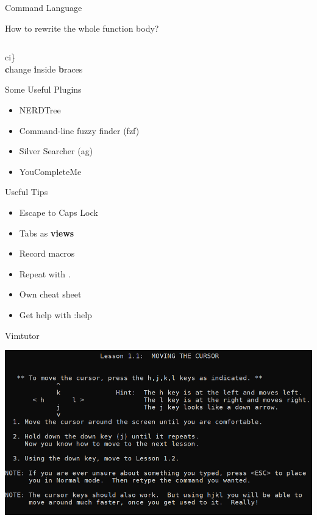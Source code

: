\documentclass{beamer}
\begin{document}
\begin{frame}{Command Language}
    \begin{block}{How to rewrite the whole function body?}
    \end{block}
    \inputminted{js}{codes/changeInsideBlock.js}
    \pause
    \begin{center}
        \huge
        ci\}
        \\
        \textbf{c}hange \textbf{i}nside \textbf{b}races
    \end{center}
\end{frame}

\begin{frame}{Some Useful Plugins}
    \begin{itemize}
        \item NERDTree
        \item Command-line fuzzy finder (fzf)
        \item Silver Searcher (ag)
        \item YouCompleteMe
    \end{itemize}
\end{frame}

\begin{frame}{Useful Tips}
    \begin{itemize}
        \item Escape to Caps Lock
        \item Tabs as \textbf{views}
        \item Record macros
        \item Repeat with .
        \item Own cheat sheet
        \item Get help with :help
    \end{itemize}
\end{frame}

\begin{frame}{Vimtutor}
    \begin{center}
        \includegraphics[width=1\textwidth]{images/vimtutor.png}
    \end{center}
\end{frame}
\end{document}
